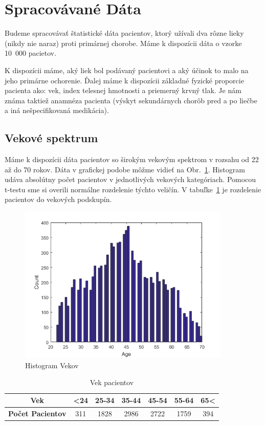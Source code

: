 \section{Spracovávané Dáta}

Budeme spracovávať štatistické dáta pacientov, ktorý užívali dva rôzne lieky (nikdy nie naraz) proti primárnej chorobe. Máme k dispozícii dáta o vzorke 10~000 pacietov.


K dispozícii máme, aký liek bol podávaný pacientovi a aký účinok to malo na jeho primárne ochorenie. Ďalej máme k dispozícii základné fyzické proporcie pacienta ako: vek, index telesnej hmotnosti a priemerný krvný tlak. Je nám známa taktiež anamnéza pacienta (výskyt sekundárnych chorôb pred a po liečbe a iná nešpecifikovaná medikácia).

\subsection{Vekové spektrum}

Máme k dispozícii dáta pacientov so širokým vekovým spektrom v rozsahu od 22 až do 70 rokov. Dáta v grafickej podobe môžme vidieť na Obr.~\ref{fig:hist-vek}. Histogram udáva absolútny počet pacientov v jednotlivých vekových kategóriach. Pomocou t-testu sme si overili normálne rozdelenie týchto veličín. V tabuľke~\ref{tab:vek} je rozdelenie pacientov do vekových podskupín.

\begin{figure}[h!]
	\centering
  		\includegraphics[width=0.9\textwidth]{ages.png}
  	\caption{Histogram Vekov}
  	\label{fig:hist-vek}
\end{figure}

\begin{table}[h!]
\centering
\label{vek}
\begin{tabular}{c|cccccc}
\hline
\textbf{Vek}             & \textless 24 & 25-34 & 35-44 & 45-54 & 55-64 & 65\textless \\ \hline
\textbf{Počet Pacientov} & 311 & 1828  & 2986  & 2722  & 1759  & 394 \\ \hline
\end{tabular}
\caption{Vek pacientov}
\label{tab:vek}
\end{table}

